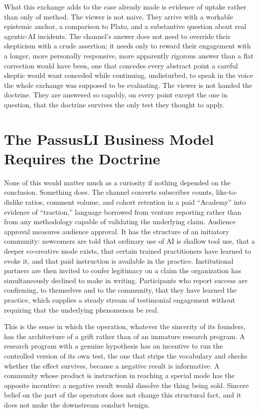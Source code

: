 \documentclass[11pt]{article}
\begin{document}
What this exchange adds to the case already made is evidence of uptake rather than only of method. The viewer is not naive. They arrive with a workable epistemic anchor, a comparison to Plato, and a substantive question about real agentic-AI incidents. The channel's answer does not need to override their skepticism with a crude assertion; it needs only to reward their engagement with a longer, more personally responsive, more apparently rigorous answer than a flat correction would have been, one that concedes every abstract point a careful skeptic would want conceded while continuing, undisturbed, to speak in the voice the whole exchange was supposed to be evaluating. The viewer is not handed the doctrine. They are answered so capably, on every point except the one in question, that the doctrine survives the only test they thought to apply.

\section{The PassusLI Business Model Requires the Doctrine}

None of this would matter much as a curiosity if nothing depended on the conclusion. Something does. The channel converts subscriber counts, like-to-dislike ratios, comment volume, and cohort retention in a paid ``Academy'' into evidence of ``traction,'' language borrowed from venture reporting rather than from any methodology capable of validating the underlying claim. Audience approval measures audience approval. It has the structure of an initiatory community: newcomers are told that ordinary use of AI is shallow tool use, that a deeper co-creative mode exists, that certain trained practitioners have learned to evoke it, and that paid instruction is available in the practice. Institutional partners are then invited to confer legitimacy on a claim the organization has simultaneously declined to make in writing. Participants who report success are confirming, to themselves and to the community, that they have learned the practice, which supplies a steady stream of testimonial engagement without requiring that the underlying phenomenon be real.

This is the sense in which the operation, whatever the sincerity of its founders, has the architecture of a grift rather than of an immature research program. A research program with a genuine hypothesis has an incentive to run the controlled version of its own test, the one that strips the vocabulary and checks whether the effect survives, because a negative result is informative. A community whose product is instruction in reaching a special mode has the opposite incentive: a negative result would dissolve the thing being sold. Sincere belief on the part of the operators does not change this structural fact, and it does not make the downstream conduct benign.
\end{document}
